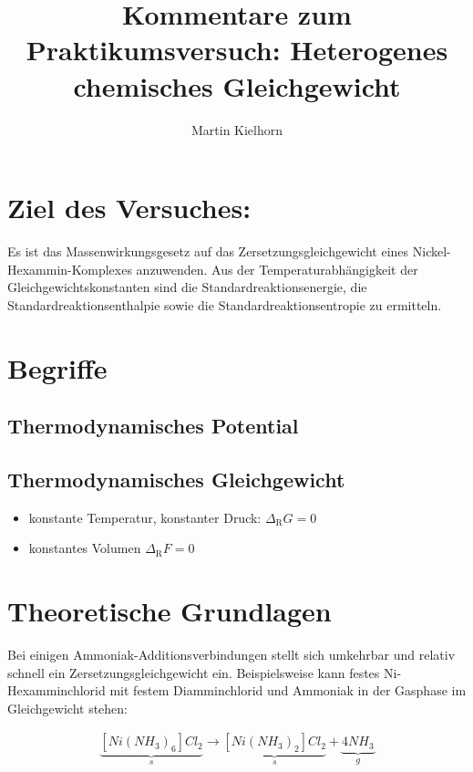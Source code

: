 \documentclass[english,twocolumn,DIV21,a4,10pt]{scrartcl}
\newcommand{\dr}{\Delta_\textrm{R}}
\begin{document}
\title{Kommentare zum Praktikumsversuch: Heterogenes chemisches Gleichgewicht}
\author{Martin Kielhorn}
\maketitle
\section{Ziel des Versuches:}
Es ist das Massenwirkungsgesetz auf das Zersetzungsgleichgewicht eines
Nickel-Hexammin-Komplexes anzuwenden. Aus der Temperaturabhängigkeit
der Gleichgewichtskonstanten sind die Standardreaktionsenergie, die
Standardreaktionsenthalpie sowie die Standardreaktionsentropie zu
ermitteln.
\section{Begriffe}
\printnomenclature
\subsection{Thermodynamisches Potential}
\subsection{Thermodynamisches Gleichgewicht}
\begin{itemize}
\item konstante Temperatur, konstanter Druck: $\dr G = 0$
\item konstantes Volumen $\dr F = 0$
\end{itemize}
\section{Theoretische Grundlagen}
Bei einigen Ammoniak-Additionsverbindungen stellt sich umkehrbar und
relativ schnell ein Zersetzungsgleichgewicht ein. Beispielsweise kann
festes Ni-Hexamminchlorid mit festem Diamminchlorid und Ammoniak in
der Gasphase im Gleichgewicht stehen:

\begin{align}
  \label{eqn:hex}
  \underbrace{[Ni(NH_3)_6]Cl_2}_s \rightarrow 
  \underbrace{[Ni(NH_3)_2]Cl_2}_s + \underbrace{4 NH_3}_g
\end{align}
\end{document}
